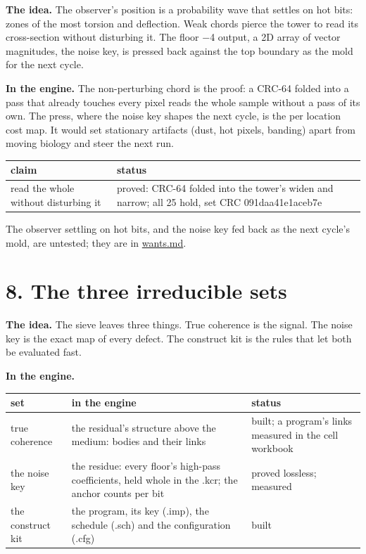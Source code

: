 \textbf{The idea.} The observer's position is a probability wave that settles on hot bits: zones of the most torsion and deflection. Weak chords pierce the tower to read its cross-section without disturbing it. The floor −4 output, a 2D array of vector magnitudes, the noise key, is pressed back against the top boundary as the mold for the next cycle.

\textbf{In the engine.} The non-perturbing chord is the proof: a CRC-64 folded into a pass that already touches every pixel reads the whole sample without a pass of its own. The press, where the noise key shapes the next cycle, is the per location cost map. It would set stationary artifacts (dust, hot pixels, banding) apart from moving biology and steer the next run.

{\small
\setlength{\tabcolsep}{6pt}
\begin{longtable}{>{\RaggedRight\arraybackslash}p{}>{\RaggedRight\arraybackslash}p{}}
\toprule
claim & status \\
\midrule
\endhead
read the whole without disturbing it & proved: CRC-64 folded into the tower's widen and narrow; all 25 hold, set CRC 091daa41e1aceb7e \\
\bottomrule
\end{longtable}
}

The observer settling on hot bits, and the noise key fed back as the next cycle's mold, are untested; they are in \hyperref[chap:wants]{wants.md}.

\section{\texorpdfstring{8. The three irreducible sets}{8. The three irreducible sets}}

\textbf{The idea.} The sieve leaves three things. True coherence is the signal. The noise key is the exact map of every defect. The construct kit is the rules that let both be evaluated fast.

\textbf{In the engine.}

{\small
\setlength{\tabcolsep}{6pt}
\begin{longtable}{>{\RaggedRight\arraybackslash}p{}>{\RaggedRight\arraybackslash}p{}>{\RaggedRight\arraybackslash}p{}}
\toprule
set & in the engine & status \\
\midrule
\endhead
true coherence & the residual's structure above the medium: bodies and their links & built; a program's links measured in the cell workbook \\
the noise key & the residue: every floor's high-pass coefficients, held whole in the .kcr; the anchor counts per bit & proved lossless; measured \\
the construct kit & the program, its key (.imp), the schedule (.sch) and the configuration (.cfg) & built \\
\bottomrule
\end{longtable}
}

